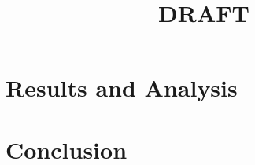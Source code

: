 \documentclass[12pt,letterpaper,oneside]{book}
\begin{document}
\frontmatter
	\tableofcontents
	\title{DRAFT}

\mainmatter
	

	

	\chapter{Results and Analysis} \label{results}
	
	
	

	\chapter{Conclusion} \label{conclusion}


\backmatter
\end{document}
